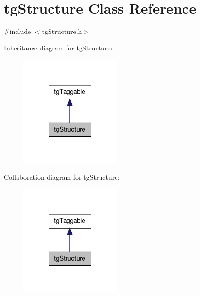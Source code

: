 \hypertarget{classtg_structure}{\section{tg\-Structure Class Reference}
\label{classtg_structure}
}


{\ttfamily \#include $<$tg\-Structure.\-h$>$}



Inheritance diagram for tg\-Structure\-:\nopagebreak
\begin{figure}[H]
\begin{center}
\leavevmode
\includegraphics[width=144pt]{classtg_structure__inherit__graph}
\end{center}
\end{figure}


Collaboration diagram for tg\-Structure\-:\nopagebreak
\begin{figure}[H]
\begin{center}
\leavevmode
\includegraphics[width=144pt]{classtg_structure__coll__graph}
\end{center}
\end{figure}
